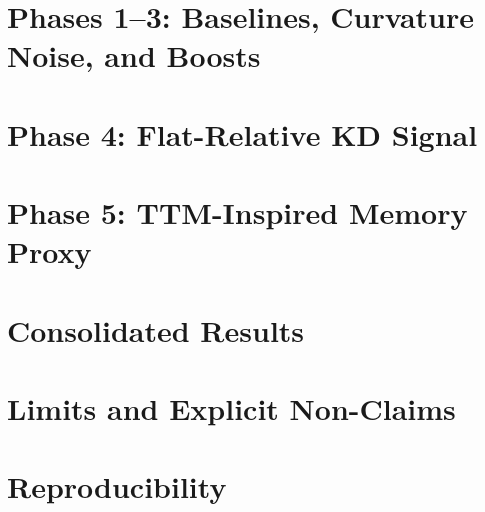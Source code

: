 \documentclass[11pt,a4paper]{article}
\begin{document}
\section{Phases 1--3: Baselines, Curvature Noise, and Boosts}
\label{sec:phase1to3}


\section{Phase 4: Flat-Relative KD Signal}
\label{sec:phase4}


\section{Phase 5: TTM-Inspired Memory Proxy}
\label{sec:phase5}


\section{Consolidated Results}
\label{sec:results}


\section{Limits and Explicit Non-Claims}
\label{sec:limits}


\section{Reproducibility}
\label{sec:repro}


\clearpage
\printbibliography
\end{document}
